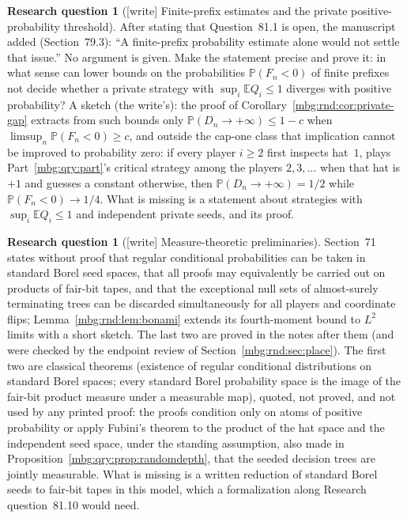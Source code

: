 \documentclass[11pt,letterpaper]{article}
\theoremstyle{definition}
\newcommand{\E}{\mathbb E}
\newcommand{\Prb}{\mathbb P}
\newtheorem{question}[theorem]{Research question}
\begin{document}
\begin{question}[{[write]} Finite-prefix estimates and the private positive-probability threshold]
\label{mbg:rnd:q:heuristic}
After stating that Question~81.1 is open, the manuscript added (Section~79.3): ``A finite-prefix probability estimate alone would not settle that issue.'' No argument is given. Make the statement precise and prove it: in what sense can lower bounds on the probabilities $\Prb(F_n<0)$ of finite prefixes not decide whether a private strategy with $\sup_i\E Q_i\le1$ diverges with positive probability? A sketch (the write's): the proof of Corollary~\ref{mbg:rnd:cor:private-gap} extracts from such bounds only $\Prb(D_n\to+\infty)\le1-c$ when $\limsup_n\Prb(F_n<0)\ge c$, and outside the cap-one class that implication cannot be improved to probability zero: if every player $i\ge2$ first inspects hat~$1$, plays Part~\ref{mbg:qry:part}'s critical strategy among the players $2,3,\ldots$ when that hat is $+1$ and guesses a constant otherwise, then $\Prb(D_n\to+\infty)=1/2$ while $\Prb(F_n<0)\to1/4$. What is missing is a statement about strategies with $\sup_i\E Q_i\le1$ and independent private seeds, and its proof.
\end{question}

\begin{question}[{[write]} Measure-theoretic preliminaries]
\label{mbg:rnd:q:measure}
Section~71 states without proof that regular conditional probabilities can be taken in standard Borel seed spaces, that all proofs may equivalently be carried out on products of fair-bit tapes, and that the exceptional null sets of almost-surely terminating trees can be discarded simultaneously for all players and coordinate flips; Lemma~\ref{mbg:rnd:lem:bonami} extends its fourth-moment bound to $L^2$ limits with a short sketch. The last two are proved in the notes after them (and were checked by the endpoint review of Section~\ref{mbg:rnd:sec:place}). The first two are classical theorems (existence of regular conditional distributions on standard Borel spaces; every standard Borel probability space is the image of the fair-bit product measure under a measurable map), quoted, not proved, and not used by any printed proof: the proofs condition only on atoms of positive probability or apply Fubini's theorem to the product of the hat space and the independent seed space, under the standing assumption, also made in Proposition~\ref{mbg:qry:prop:randomdepth}, that the seeded decision trees are jointly measurable. What is missing is a written reduction of standard Borel seeds to fair-bit tapes in this model, which a formalization along Research question~81.10 would need.
\end{question}
\end{document}
